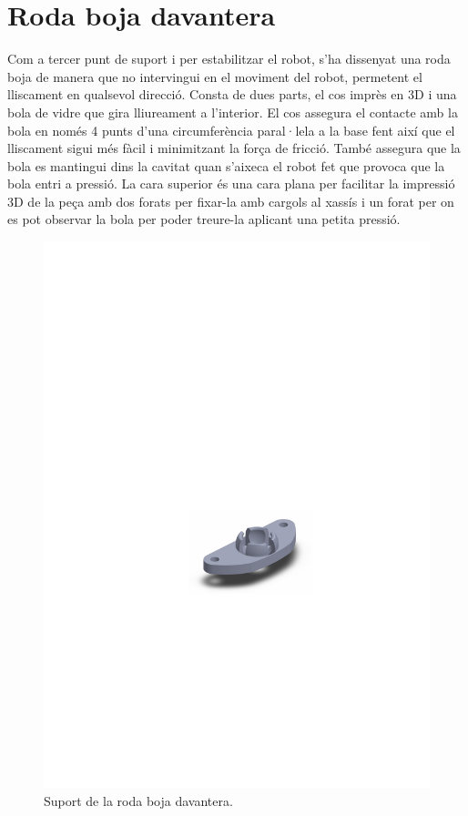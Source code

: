 \section{Roda boja davantera}

Com a tercer punt de suport i per estabilitzar el robot, s’ha dissenyat una roda boja de manera que no intervingui en el moviment del robot, permetent el lliscament en qualsevol direcció. Consta de dues parts, el cos imprès en 3D i una bola de vidre que gira lliureament a l'interior. El cos assegura el contacte amb la bola en només 4 punts d’una circumferència paral·lela a la base fent així que el lliscament sigui més fàcil i minimitzant la força de fricció. També assegura que la bola es mantingui dins la cavitat quan s’aixeca el robot fet que provoca que la bola entri a pressió. La cara superior és una cara plana per facilitar la impressió 3D de la peça amb dos forats per fixar-la amb cargols al xassís i un forat per on es pot observar la bola per poder treure-la aplicant una petita pressió. 

\begin{figure}[H]
	\centering
	\includegraphics{bolaboja}
	\caption{Suport de la roda boja davantera.}
	\label{fig:bolaboja1}
\end{figure}

